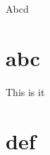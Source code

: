 \documentclass{article}
\begin{document}
Abcd


\section{abc}
\label{sec:a}

This is it


\section{def}
\label{sec:af}
\end{document}
